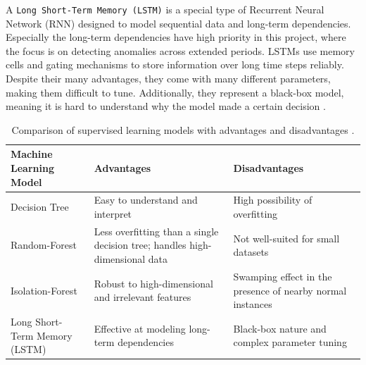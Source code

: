A \texttt{Long Short-Term Memory (LSTM)} is a special type of Recurrent Neural Network (RNN) designed to model sequential data and long-term dependencies. Especially the long-term dependencies have high priority in this project, where the focus is on detecting anomalies across extended periods. LSTMs use memory cells and gating mechanisms to store information over long time steps reliably. Despite their many advantages, they come with many different parameters, making them difficult to tune. Additionally, they represent a black-box model, meaning it is hard to understand why the model made a certain decision \cite{LSTM_understanding}.

\begin{table}[H]
	\centering
	\begin{tabular}{|l|p{5cm}|p{5cm}|}
		\hline
		\textbf{Machine Learning Model} & \textbf{Advantages} & \textbf{Disadvantages} \\
		\hline
		Decision Tree & Easy to understand and interpret & High possibility of overfitting \\
		\hline
		Random-Forest & Less overfitting than a single decision tree; handles high-dimensional data & Not well-suited for small datasets \\
		\hline
		Isolation-Forest & Robust to high-dimensional and irrelevant features & Swamping effect in the presence of nearby normal instances \\
		\hline
		Long Short-Term Memory (LSTM) & Effective at modeling long-term dependencies & Black-box nature and complex parameter tuning \\
		\hline
	\end{tabular}
	\caption{Comparison of supervised learning models with advantages and disadvantages \cite{decision_tree_explain}\cite{breiman2001randomforests}\cite{iForest}\cite{LSTM_understanding}.}
    \label{tab:supervised_learning_models}
\end{table}